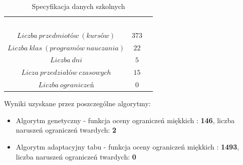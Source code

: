 \begin{table}[H]
\begin{center}
\begin{tabular}{ |c|c|c| }
\multicolumn{1}{r}{}
 &  \multicolumn{1}{c}{$$}
 & \multicolumn{1}{c}{$$} 
 \\
\cline{1-2}
$Liczba\ przedmiotów\ (kursów)$ & $373$\\
\cline{1-2}
$Liczba\ klas\ (programów\ nauczania)$ & $22$\\
\cline{1-2}
$Liczba\ dni$ & $5$ \\
\cline{1-2}
$Licza\ przedziałów\ czasowych$ & $15$ \\
\cline{1-2}
$Liczba\ ograniczeń$ & $0$ \\
\cline{1-2}
\end{tabular}
\end{center}
\caption {Specyfikacja danych szkolnych}
\end{table}
Wyniki uzyskane przez poszczególne algorytmy:
\begin{itemize}
\item Algorytm genetyczny - funkcja oceny ograniczeń miękkich : \textbf{146}, liczba naruszeń ograniczeń twardych: \textbf{2}
\item Algorytm adaptacyjny tabu - funkcja oceny ograniczeń miękkich : \textbf{1493}, liczba naruszeń ograniczeń twardych: \textbf{0}
\end{itemize}
